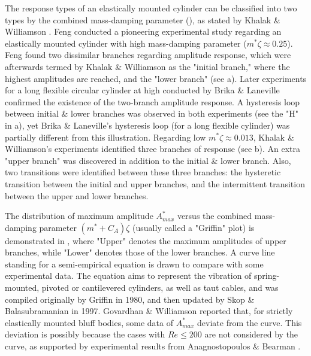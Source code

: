 The response types of an elastically mounted cylinder can be classified into two types by the combined mass-damping parameter (\md{}), as stated by Khalak \& Williamson \cite{KHALAK1999}. Feng \cite{Feng1968} conducted a pioneering experimental study regarding an elastically mounted cylinder with high mass-damping parameter ($m^*\zeta\approx0.25$). Feng found two dissimilar branches regarding amplitude response, which were afterwards termed by Khalak \& Williamson as the "initial branch," where the highest amplitudes are reached, and the "lower branch" (see a). Later experiments for a long flexible circular cylinder at high \md{} conducted by Brika \& Laneville \cite{Brika1993} confirmed the existence of the two-branch amplitude response. A hysteresis loop between initial \& lower branches was observed in both experiments (see the "H" in a), yet Brika \& Laneville's hysteresis loop (for a long flexible cylinder) was partially different from this illustration. Regarding low $m^*\zeta\approx0.013$, Khalak \& Williamson's experiments \cite{KHALAK1999,Khalak1996,Khalak1997a} identified three branches of response (see b). An extra "upper branch" was discovered in addition to the initial \& lower branch. Also, two transitions were identified between these three branches: the hysteretic transition between the initial and upper branches, and the intermittent transition between the upper and lower branches. 
%


The distribution of maximum amplitude $A^*_{max}$ versus the combined mass-damping parameter $(m^*+C_A)\zeta$ (usually called a "Griffin" plot) is demonstrated in  \cite{GOVARDHAN2000}, where "Upper" denotes the maximum amplitudes of upper branches, while "Lower" denotes those of the lower branches. A curve line standing for a semi-empirical equation is drawn to compare with some experimental data. The equation aims to represent the vibration of spring-mounted, pivoted or cantilevered cylinders, as well as taut cables, and was compiled originally by Griffin \cite{Griffin1980} in 1980, and then updated by Skop \& Balasubramanian \cite{skop1997new} in 1997. Govardhan \& Williamson reported that, for strictly elastically mounted bluff bodies, some data of $A^*_{max}$ deviate from the curve. This deviation is possibly because the cases with $Re\leq200$ are not considered by the curve, as supported by experimental results from Anagnostopoulos \& Bearman \cite{Anagnostopoulos1992}.


